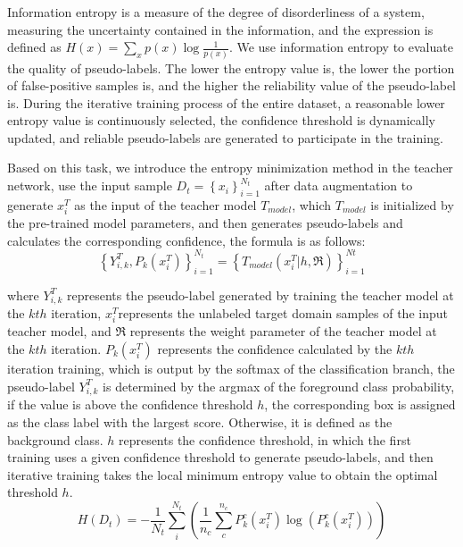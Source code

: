 \documentclass[sn-mathphys]{sn-jnl}%
\theoremstyle{thmstyleone}%
\theoremstyle{thmstyletwo}%
\theoremstyle{thmstylethree}%
\begin{document}
Information entropy is a measure of the degree of disorderliness of a system, measuring the uncertainty contained in the information, and the expression is defined as $H(x)=\sum\limits_{x}{p(x)\log \frac{1}{p(x)}}$. We use information entropy to evaluate the quality of pseudo-labels. The lower the entropy value is, the lower the portion of false-positive samples is, and the higher the reliability value of the pseudo-label is. During the iterative training process of the entire dataset, a reasonable lower entropy value is continuously selected, the confidence threshold is dynamically updated, and reliable pseudo-labels are generated to participate in the training.


Based on this task, we introduce the entropy minimization method in the teacher network, use the input sample ${{D}_{t}}=\left\{ {{x}_{i}} \right\}_{i=1}^{{{N}_{t}}}$ after data augmentation to generate $x_{i}^{T}$ as the input of the teacher model ${{T}_{model}}$, which ${{T}_{model}}$ is initialized by the pre-trained model parameters, and then generates pseudo-labels and calculates the corresponding confidence, the formula is as follows:
\begin{equation}
\left\{ Y_{i,k}^{T},{{P}_{k}}(x_{i}^{T}) \right\}_{i=1}^{{{N}_{t}}}=\left\{ {{T}_{model}}(x_{i}^{T}\vert h,\Re ) \right\}_{i=1}^{Nt}
\label{eq:02}
\end{equation}

where $Y_{i,k}^{T}$ represents the pseudo-label generated by training the teacher model at the $kth$ iteration,  $x_{i}^{T}$represents the unlabeled target domain samples of the input teacher model, and $\Re$  represents the weight parameter of the teacher model at the $kth$ iteration. ${{P}_{k}}(x_{i}^{T})$ represents the confidence calculated by the $kth$ iteration training, which is output by the softmax of the classification branch, the pseudo-label $Y_{i,k}^{T}$ is determined by the argmax of the foreground class probability, if the value is above the confidence threshold $h$, the corresponding box is assigned as the class label with the largest score. Otherwise, it is defined as the background class. $h$ represents the confidence threshold, in which the first training uses a given confidence threshold to generate pseudo-labels, and then iterative training takes the local minimum entropy value to obtain the optimal threshold $h$.
\begin{equation}
H({{D}_{t}})=-\frac{1}{{{N}_{t}}}\sum\limits_{i}^{{{N}_{t}}}{\left( \frac{1}{{{n}_{c}}}\sum\limits_{c}^{{{n}_{c}}}{P_{k}^{c}(x_{i}^{T})\log (P_{k}^{c}(x_{i}^{T}))} \right)}
\label{eq:03}
\end{equation}
\end{document}
